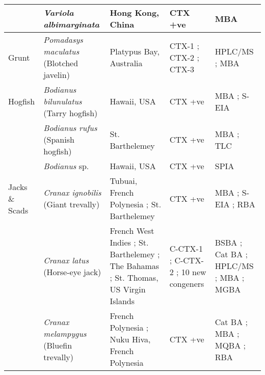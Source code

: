 \documentclass[12pt]{article}
\begin{document}
\begin{longtable}{  | p{2cm} | p{3cm} | p{4.5cm}  | p{2cm} | p{3cm}  | }
  & \emph{Variola albimarginata}  & Hong Kong, China \cite{wong2008features} & CTX +ve \cite{wong2008features} & MBA \cite{wong2008features} \\
  \hline
 Grunt & \emph{Pomadasys maculatus} (Blotched javelin) & Platypus Bay, Australia \cite{lewis1992multiple} & CTX-1 \cite{lewis1992multiple}; CTX-2 \cite{lewis1992multiple}; CTX-3 \cite{lewis1992multiple} & HPLC/MS \cite{lewis1992multiple}; MBA \cite{lewis1992multiple} \\
 \hline
Hogfish  &  \emph{Bodianus bilunulatus} (Tarry hogfish) & Hawaii, USA \cite{hokama1985rapid} & CTX +ve \cite{hokama1985rapid} & MBA \cite{hokama1985rapid}; S-EIA \cite{hokama1985rapid} \\
  & \emph{Bodianus rufus} (Spanish hogfish)  & St. Barthelemey \cite{vernoux1986heterogeneity} & CTX +ve \cite{vernoux1986heterogeneity} & MBA \cite{vernoux1986heterogeneity}; TLC \cite{vernoux1986heterogeneity} \\
  & \emph{Bodianus} sp. & Hawaii, USA \cite{hokama1990simplified} & CTX +ve \cite{hokama1990simplified} & SPIA \cite{hokama1990simplified}\\
  \hline
Jacks \& Scads  &  \emph{Cranax ignobilis} (Giant trevally) & Tubuai, French Polynesia \cite{darius2007ciguatera}; St. Barthelemey \cite{vernoux1986heterogeneity} & CTX +ve \cite{hokama1985rapid,darius2007ciguatera} & MBA \cite{hokama1985rapid}; S-EIA \cite{hokama1985rapid}; RBA \cite{darius2007ciguatera} \\
  & \emph{Cranax latus} (Horse-eye jack) & French West Indies \cite{pottier2002characterisation}; St. Barthelemey \cite{vernoux1997isolation,lewis1998structure}; The Bahamas \cite{larson1967ciguatera}; St. Thomas, US Virgin Islands \cite{granade1976ciguatera} & C-CTX-1 \cite{pottier2002characterisation,vernoux1997isolation,lewis1998structure}; C-CTX-2 \cite{vernoux1997isolation,pottier2002characterisation,lewis1998structure}; 10 new congeners \cite{pottier2002characterisation} & BSBA \cite{granade1976ciguatera}; Cat BA \cite{larson1967ciguatera}; HPLC/MS \cite{pottier2002characterisation,vernoux1997isolation,lewis1998structure}; MBA \cite{pottier2002characterisation,vernoux1997isolation} ; MGBA \cite{granade1976ciguatera}\\
  & \emph{Cranax melampygus} (Bluefin trevally) & French Polynesia \cite{bagnis1987use}; Nuku Hiva, French Polynesia \cite{darius2007ciguatera} & CTX +ve \cite{bagnis1987use,darius2007ciguatera} & Cat BA \cite{bagnis1987use}; MBA \cite{bagnis1987use}; MQBA \cite{bagnis1987use}; RBA \cite{darius2007ciguatera} \\

\end{longtable}
\end{document}
